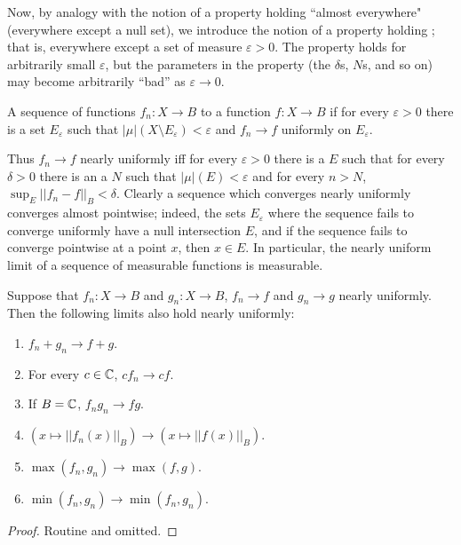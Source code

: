 \begin{subsec}
Now, by analogy with the notion of a property holding ``almost everywhere" (everywhere except a null set), we introduce the notion of a property holding ; that is, everywhere except a set of measure $\varepsilon > 0$. The property holds for arbitrarily small $\varepsilon$, but the parameters in the property (the $\delta$s, $N$s, and so on) may become arbitrarily ``bad'' as $\varepsilon \to 0$.
\end{subsec}

\begin{definition}
A sequence of functions $f_{n}: X \to B$  to a function $f: X \to B$ if for every $\varepsilon > 0$ there is a set $E_\varepsilon$ such that $|\mu|(X \setminus E_\varepsilon) < \varepsilon$ and $f_{n} \to f$ uniformly on $E_\varepsilon$.
\end{definition}

\begin{subsec}
Thus $f_{n} \to f$ nearly uniformly iff for every $\varepsilon > 0$ there is a $E$ such that for every $\delta > 0$ there is an a $N$ such that $|\mu|(E) < \varepsilon$ and for every $n > N$, $\sup_{E} ||f_{n} - f||_{B} < \delta$.
Clearly a sequence which converges nearly uniformly converges almost pointwise; indeed, the sets $E_\varepsilon$ where the sequence fails to converge uniformly have a null intersection $E$, and if the sequence fails to converge pointwise at a point $x$, then $x \in E$.
In particular, the nearly uniform limit of a sequence of measurable functions is measurable.
\end{subsec}

\begin{lemma}
Suppose that $f_{n}: X \to B$ and $g_{n}: X \to B$, $f_{n} \to f$ and $g_{n} \to g$ nearly uniformly. Then the following limits also hold nearly uniformly:
\begin{enumerate}
\item $f_{n} + g_{n} \to f + g$.
\item For every $c \in \mathbb{C}$, $cf_{n} \to cf$.
\item If $B = \mathbb{C}$, $f_{n}g_{n} \to fg$.
\item $(x \mapsto ||f_{n}(x)||_B) \to (x \mapsto ||f(x)||_B)$.
\item $\max(f_{n}, g_{n}) \to \max(f, g)$.
\item $\min(f_{n}, g_{n}) \to \min(f_{n}, g_{n})$.
\end{enumerate}
\end{lemma}
\begin{proof}
Routine and omitted.
\end{proof}

